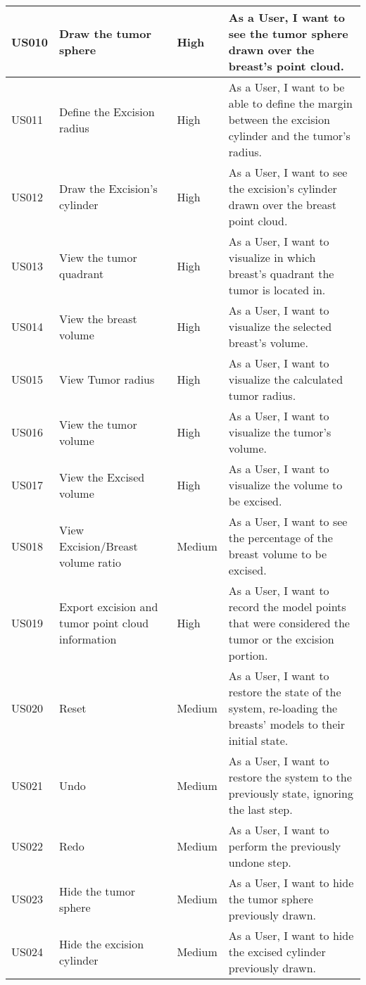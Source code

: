 \begin{longtable}{|l|p{30mm}|l|p{90mm}|}
US010       & Draw the tumor sphere             & High                 & As a User, I want to see the tumor sphere drawn over the breast's point cloud.                   \\ \hline
US011       & Define the Excision radius             & High                 & As a User, I want to be able to define the margin between the excision cylinder and the tumor's radius.                    \\ \hline
US012       & Draw the Excision's cylinder             & High                 & As a User, I want to see the excision's cylinder drawn over the breast point cloud.                   \\ \hline
US013       & View the tumor quadrant             & High                 & As a User, I want to visualize in which breast's quadrant the tumor is located in.                   \\ \hline
US014       & View the breast volume             & High                 & As a User, I want to visualize the selected breast's volume.                   \\ \hline
US015       & View Tumor radius             & High                 & As a User, I want to visualize the calculated tumor radius.                   \\ \hline
US016       & View the tumor volume             & High                 & As a User, I want to visualize the tumor's volume.                    \\ \hline
US017       & View the Excised volume             & High                 & As a User, I want to visualize the volume to be excised.                   \\ \hline
US018       & View Excision/Breast volume ratio             & Medium                 & As a User, I want to see the percentage of the breast volume to be excised.                    \\ \hline
US019       & Export excision and tumor point cloud information             & High                 & As a User, I want to record the model points that were considered the tumor or the excision portion.                   \\ \hline
US020       & Reset             & Medium                 & As a User, I want to restore the state of the system, re-loading the breasts' models to their initial state.                   \\ \hline
US021       & Undo             & Medium                 & As a User, I want to restore the system to the previously state, ignoring the last step.                    \\ \hline
US022       & Redo             & Medium                 & As a User, I want to perform the previously undone step.                   \\ \hline
US023       & Hide the tumor sphere             & Medium                 & As a User, I want to hide the tumor sphere previously drawn.                   \\ \hline
US024       & Hide the excision cylinder             & Medium                 & As a User, I want to hide the excised cylinder previously drawn.                   \\ \hline


\end{longtable}
